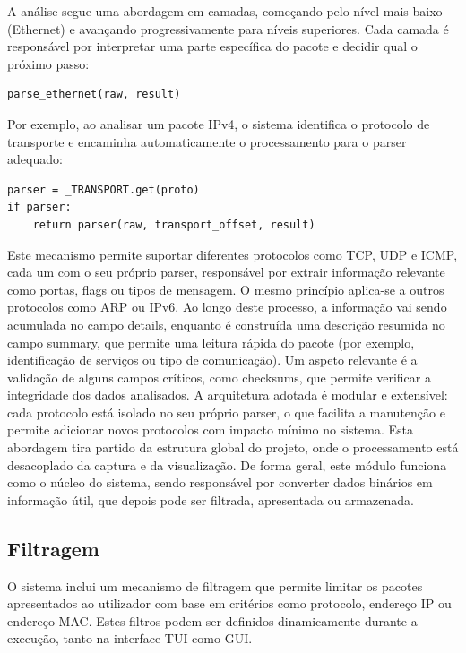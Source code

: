 \documentclass[a4paper]{article}
\begin{document}
A análise segue uma abordagem em camadas, começando pelo nível mais baixo (Ethernet) e avançando progressivamente para níveis superiores. Cada camada é responsável por interpretar uma parte específica do pacote e decidir qual o próximo passo:

\vspace{0.15cm}
\begin{lstlisting}
parse_ethernet(raw, result)
\end{lstlisting}
\vspace{0.15cm}

Por exemplo, ao analisar um pacote IPv4, o sistema identifica o protocolo de transporte e encaminha automaticamente o processamento para o parser adequado:

\vspace{0.15cm}
\begin{lstlisting}
parser = _TRANSPORT.get(proto)
if parser:
    return parser(raw, transport_offset, result)
\end{lstlisting}
\vspace{0.15cm}

Este mecanismo permite suportar diferentes protocolos como TCP, UDP e ICMP, cada um com o seu próprio parser, responsável por extrair informação relevante como portas, flags ou tipos de mensagem. O mesmo princípio aplica-se a outros protocolos como ARP ou IPv6.
Ao longo deste processo, a informação vai sendo acumulada no campo details, enquanto é construída uma descrição resumida no campo summary, que permite uma leitura rápida do pacote (por exemplo, identificação de serviços ou tipo de comunicação).
Um aspeto relevante é a validação de alguns campos críticos, como checksums, que permite verificar a integridade dos dados analisados.
A arquitetura adotada é modular e extensível: cada protocolo está isolado no seu próprio parser, o que facilita a manutenção e permite adicionar novos protocolos com impacto mínimo no sistema. Esta abordagem tira partido da estrutura global do projeto, onde o processamento está desacoplado da captura e da visualização.
De forma geral, este módulo funciona como o núcleo do sistema, sendo responsável por converter dados binários em informação útil, que depois pode ser filtrada, apresentada ou armazenada.

\subsection{Filtragem}
O sistema inclui um mecanismo de filtragem que permite limitar os pacotes apresentados ao utilizador com base em critérios como protocolo, endereço IP ou endereço MAC. Estes filtros podem ser definidos dinamicamente durante a execução, tanto na interface TUI como GUI.
\end{document}
